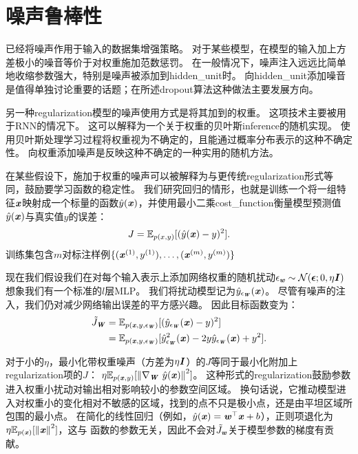 
\section{噪声鲁棒性}
\label{sec:noise_robustness}

已经将噪声作用于输入的数据集增强策略。
对于某些模型，在模型的输入加上方差极小的噪音等价于对权重施加范数惩罚\citep{Bishop1995,bishop95training}。
在一般情况下，噪声注入远远比简单地收缩参数强大，特别是噪声被添加到\gls{hidden_unit}时。
向\gls{hidden_unit}添加噪音是值得单独讨论重要的话题；在所述\gls{dropout}算法这种做法主要发展方向。

另一种\gls{regularization}模型的噪声使用方式是将其加到的权重。
这项技术主要被用于\gls{RNN}的情况下\citep{JimGilesHorne1996,Graves-2011}。
这可以解释为一个关于权重的贝叶斯\gls{inference}的随机实现。
使用贝叶斯处理学习过程将权重视为不确定的，且能通过概率分布表示的这种不确定性。
向权重添加噪声是反映这种不确定的一种实用的随机方法。

在某些假设下，施加于权重的噪声可以被解释为与更传统\gls{regularization}形式等同，鼓励要学习函数的稳定性。
我们研究回归的情形，也就是训练一个将一组特征$\boldsymbol{\mathit{x}}$映射成一个标量的函数$\hat y(\boldsymbol{\mathit{x}})$，并使用最小二乘\gls{cost_function}衡量模型预测值$\hat y(\boldsymbol{\mathit{x}})$与真实值$y$的误差：
\begin{align}
 J = \mathbb{E}_{p(x,y)}[(\hat y(\boldsymbol{\mathit{x}}) - y)^2].
\end{align}
训练集包含$m$对标注样例$\{(\boldsymbol{\mathit{x}}^{(1)}, y^{(1)}),\dots,(\boldsymbol{\mathit{x}}^{(m)}, y^{(m)})\}$

现在我们假设我们在对每个输入表示上添加网络权重的随机扰动$\epsilon_{\boldsymbol{\mathit{w}}} \sim \mathcal{N}(\boldsymbol{\epsilon};0, \eta\boldsymbol{\mathit{I}} )$
想象我们有一个标准的$l$层MLP。
我们将扰动模型记为$\hat y_{\epsilon_{\boldsymbol{\mathit{W}}}} (\boldsymbol{\mathit{x}})$。
尽管有噪声的注入，我们仍对减少网络输出误差的平方感兴趣。
因此目标函数变为：
\begin{align}
 \tilde J_{\boldsymbol{\mathit{W}}} &= \mathbb{E}_{p(\boldsymbol{\mathit{x}},y,\epsilon_{\boldsymbol{\mathit{W}}})}[(\hat y_{\epsilon_{\boldsymbol{\mathit{W}}}}(\boldsymbol{\mathit{x}}) - y)^2] \\
   &=  \mathbb{E}_{p(\boldsymbol{\mathit{x}},y,\epsilon_{\boldsymbol{\mathit{W}}})}[\hat y_{\epsilon_{\boldsymbol{\mathit{W}}}}^2(\boldsymbol{\mathit{x}}) -  2y\hat y_{\epsilon_{\boldsymbol{\mathit{W}}}}
   (\boldsymbol{\mathit{x}})+ y^2] .
\end{align}

对于小的$\eta$，最小化带权重噪声（方差为$\eta \boldsymbol{\mathit{I}}$）的$J$等同于最小化附加上\gls{regularization}项的$J$：
$ \eta \mathbb{E}_{p(\boldsymbol{\mathit{x}},y)}[\left\lVert\nabla_{\boldsymbol{\mathit{W}}}~\hat y(\boldsymbol{\mathit{x}})\right\rVert^2]$。
这种形式的\gls{regularization}鼓励参数进入权重小扰动对输出相对影响较小的参数空间区域。
换句话说，它推动模型进入对权重小的变化相对不敏感的区域，找到的点不只是极小点，还是由平坦区域所包围的最小点\citep{Hochreiter95}。
在简化的线性回归（例如，$\hat y(\boldsymbol{\mathit{x}}) = \boldsymbol{\mathit{w}}^\top \boldsymbol{\mathit{x}} + b$），正则项退化为$ \eta \mathbb{E}_{p(\boldsymbol{\mathit{x}})}[\left\lVert\boldsymbol{\mathit{x}}\right\rVert^2]$，这与
函数的参数无关，因此不会对$\tilde J_{\boldsymbol{\mathit{w}}}$关于模型参数的梯度有贡献。

